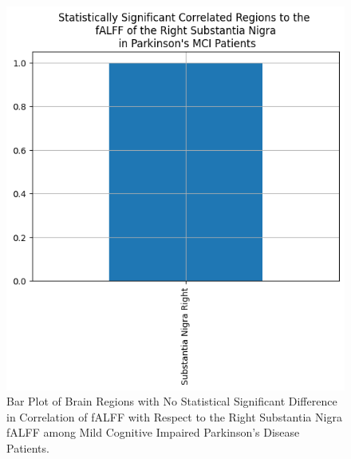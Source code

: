 \documentclass[12pt]{article}
\begin{document}
\begin{figure}[h]  %
    \centering
    \includegraphics[width=\textwidth]{"../img/statistically_significant_correlated_regions_sn_mci.png"}  %
    \caption{Bar Plot of Brain Regions with No Statistical Significant Difference in Correlation of fALFF with Respect to the Right Substantia Nigra fALFF among Mild Cognitive Impaired Parkinson's Disease Patients.}
    \label{fig:mci}  %
\end{figure}
\end{document}
